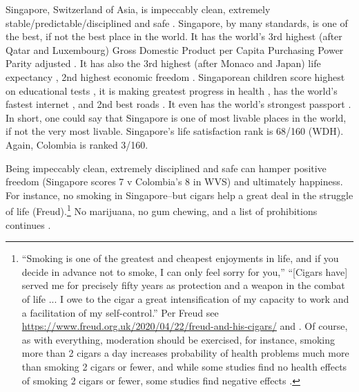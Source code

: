 \documentclass[10pt, letterpaper]{article}
\begin{document}
\begin{spacing}{2}
Singapore, Switzerland of Asia, is impeccably %
 clean, extremely stable/predictable/disciplined and safe
\citep{singapore22laws,singapore22nanny}. 
%
Singapore, by many standards, is one of the
best, if not the best place in the world. It has the world's 3rd highest (after
Qatar and Luxembourg) Gross Domestic Product per Capita Purchasing Power Parity
adjusted \citep{authorNYT17monD}. It has also the 3rd highest (after Monaco and
Japan) life expectancy \citep{cia},
 2nd highest economic freedom \citep{heritage}. Singaporean children score highest on educational
tests \citep{coughlanBBC17dec6}, it is making greatest progress in health
\citep{fullman2017measuring}, has the world's fastest internet
\citep{mcspaddenNYT17monD}, and 2nd best roads \citep{world2017travel}.
 It even has the world's strongest passport \citep{chandranCNBC17oct24}. In short, one could say that Singapore %
 is one of most livable places in the world, if not the very most livable. 
 Singapore's life satisfaction rank is 68/160 (WDH). Again, Colombia is ranked 3/160.


Being impeccably clean, extremely disciplined and safe can hamper positive freedom
(Singapore scores 7 v Colombia's 8 in WVS) and ultimately happiness. For instance,
no smoking in Singapore--but cigars help a great deal in the struggle of life (Freud).\footnote{
``Smoking is one of the greatest and cheapest enjoyments in life, and if you
decide in advance not to smoke, I can only feel sorry for you,''  ``[Cigars have] served me for precisely fifty years as protection and a weapon in the combat of life ... I owe to the cigar a great intensification of my capacity to work and a facilitation of my self-control.'' %
  Per Freud see
  \url{https://www.freud.org.uk/2020/04/22/freud-and-his-cigars/} and
  \citet{elkinCA94}. Of course, as with everything, moderation should be
  exercised, for instance, smoking more than 2 cigars a day increases
  probability of health problems much more than smoking 2 cigars or fewer, and while some studies find no health effects of smoking 2 cigars or fewer, some studies  find negative effects \citep[e.g.,][]{chang15}.
  }
 No marijuana, no gum chewing, and a list of prohibitions
continues \citep{singapore22laws,singapore22nanny}.



\end{spacing}
\end{document}
